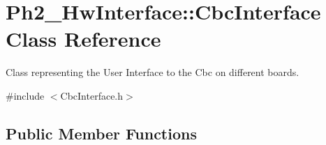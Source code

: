\hypertarget{class_ph2___hw_interface_1_1_cbc_interface}{\section{Ph2\-\_\-\-Hw\-Interface\-:\-:Cbc\-Interface Class Reference}
\label{class_ph2___hw_interface_1_1_cbc_interface}
}


Class representing the User Interface to the Cbc on different boards.  




{\ttfamily \#include $<$Cbc\-Interface.\-h$>$}

\subsection*{Public Member Functions}

